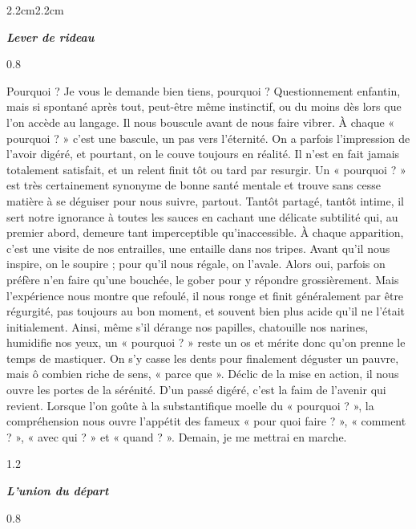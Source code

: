 \newpage
\begin{adjustwidth}{2.2cm}{2.2cm}

\begin{center}
\textit{\textbf{Lever de rideau}}
\end{center}
\begin{spacing}{0.8}
~
\end{spacing}
Pourquoi ? Je vous le demande bien tiens, pourquoi ? Questionnement enfantin, mais si spontané après tout, peut-être même instinctif, ou du moins dès lors que l’on accède au langage. Il nous bouscule avant de nous faire vibrer. À chaque « pourquoi ? » c’est une bascule, un pas vers l’éternité. On a parfois l’impression de l’avoir digéré, et pourtant, on le couve toujours en réalité. Il n’est en fait jamais totalement satisfait, et un relent finit tôt ou tard par resurgir. Un « pourquoi ? » est très certainement synonyme de bonne santé mentale et trouve sans cesse matière à se déguiser pour nous suivre, partout. Tantôt partagé, tantôt intime, il sert notre ignorance à toutes les sauces en cachant une délicate subtilité qui, au premier abord, demeure tant imperceptible qu’inaccessible. À chaque apparition, c’est une visite de nos entrailles, une entaille dans nos tripes. Avant qu’il nous inspire, on le soupire ; pour qu’il nous régale, on l’avale. Alors oui, parfois on préfère n’en faire qu’une bouchée, le gober pour y répondre grossièrement. Mais l’expérience nous montre que refoulé, il nous ronge et finit généralement par être régurgité, pas toujours au bon moment, et souvent bien plus acide qu’il ne l’était initialement. Ainsi, même s’il dérange nos papilles, chatouille nos narines, humidifie nos yeux, un « pourquoi ? » reste un os et mérite donc qu’on prenne le temps de mastiquer. On s’y casse les dents pour finalement déguster un pauvre, mais ô combien riche de sens, « parce que ». Déclic de la mise en action, il nous ouvre les portes de la sérénité. D’un passé digéré, c’est la faim de l’avenir qui revient. Lorsque l’on goûte à la substantifique moelle du « pourquoi ? », la compréhension nous ouvre l’appétit des fameux « pour quoi faire ? », « comment ? », « avec qui ? » et « quand ? ». Demain, je me mettrai en marche.
\begin{spacing}{1.2}
~
\end{spacing}
\begin{center}
\textbf{\textit{L’union du départ}}
\end{center}
\begin{spacing}{0.8}
~
\end{spacing}

\end{adjustwidth}
